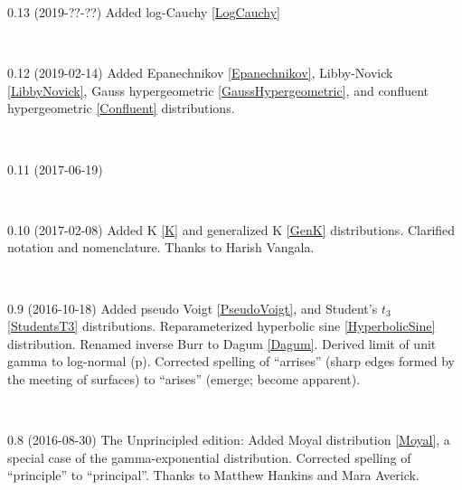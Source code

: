 {
\small \tightstretch

0.13 (2019-??-??)
Added
log-Cauchy \eqref{LogCauchy}


~

0.12 (2019-02-14) 
Added
Epanechnikov \eqref{Epanechnikov}, 
Libby-Novick \eqref{LibbyNovick},
Gauss hypergeometric \eqref{GaussHypergeometric},
and
confluent hypergeometric \eqref{Confluent}
distributions. 

~

0.11 (2017-06-19)

~

0.10 (2017-02-08)
Added K \eqref{K}  and generalized K  \eqref{GenK} distributions.
Clarified notation and nomenclature.
Thanks to Harish Vangala.

~

0.9 (2016-10-18)
Added 
	pseudo Voigt \eqref{PseudoVoigt}, 
and
	Student's $t_3$ \eqref{StudentsT3}
distributions.
Reparameterized hyperbolic sine \eqref{HyperbolicSine} distribution.
Renamed inverse Burr to Dagum \eqref{Dagum}. %
Derived limit of unit gamma to log-normal (p\pageref{UnitGammaToLogNormal}). 
Corrected spelling of  ``arrises'' (sharp edges formed by the meeting of surfaces) to ``arises'' (emerge; become apparent). 

~

0.8 (2016-08-30)
The Unprincipled edition:
Added Moyal distribution \eqref{Moyal}, a special case of the gamma-exponential distribution.
Corrected spelling of ``principle'' to ``principal''. Thanks to Matthew Hankins and Mara Averick.

}
